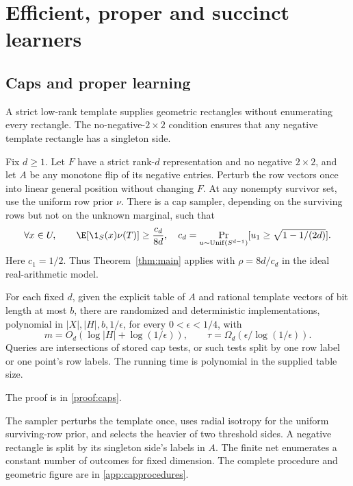 \section{Efficient, proper and succinct learners}\label{sec:learners}
\subsection{Caps and proper learning}\label{sec:caps}
A strict low-rank template supplies geometric rectangles without enumerating every rectangle. The no-negative-$2\times2$ condition ensures that any negative template rectangle has a singleton side.
\begin{theorem}\label{thm:caps}
Fix $d\ge1$. Let $F$ have a strict rank-$d$ representation and no negative $2\times2$, and let $A$ be any monotone flip of its negative entries. Perturb the row vectors once into linear general position without changing $F$. At any nonempty survivor set, use the uniform row prior $\nu$. There is a cap sampler, depending on the surviving rows but not on the unknown marginal, such that
\begin{equation}\label{eq:capcoverage}
 \forall x\in U,\qquad \E[\1_S(x)\nu(T)]\ge\frac{c_d}{8d},
 \quad c_d=\Pr_{u\sim\mathrm{Unif}(S^{d-1})}
 [u_1\ge\sqrt{1-1/(2d)}].
\end{equation}
Here $c_1=1/2$. Thus Theorem~\ref{thm:main} applies with $\rho=8d/c_d$ in the ideal real-arithmetic model.

For each fixed $d$, given the explicit table of $A$ and rational template vectors of bit length at most $b$, there are randomized and deterministic implementations, polynomial in $|X|,|H|,b,1/\epsilon$, for every $0<\epsilon<1/4$, with
\[
 m=O_d(\log|H|+\log(1/\epsilon)),\qquad
 \tau=\Omega_d(\epsilon/\log(1/\epsilon)).
\]
Queries are intersections of stored cap tests, or such tests split by one row label or one point's row labels. The running time is polynomial in the supplied table size.
\end{theorem}
\noindent The proof is in \cref{proof:caps}.

The sampler perturbs the template once, uses radial isotropy for the uniform surviving-row prior, and selects the heavier of two threshold sides. A negative rectangle is split by its singleton side's labels in $A$. The finite net enumerates a constant number of outcomes for fixed dimension. The complete procedure and geometric figure are in \cref{app:capprocedures}.
